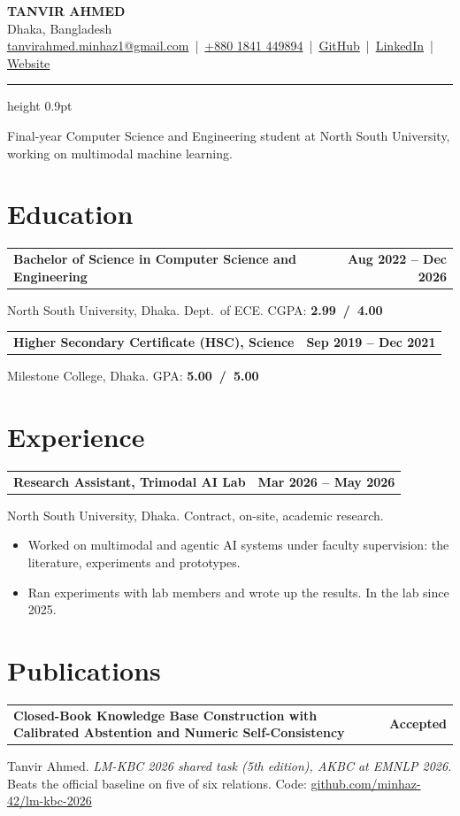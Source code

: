 \documentclass[10pt,letterpaper]{article}
\makeatletter
\newcommand{\entryhead}[2]{\par\vspace{4pt}\noindent%
  \begin{tabular*}{\textwidth}[t]{@{}>{\raggedright\arraybackslash}p{0.75\textwidth}@{\extracolsep{\fill}}r@{}}
    \textbf{#1} & #2
  \end{tabular*}\par\vspace{1pt}}
\newcommand{\entry}[2]{\entryhead{#1}{\textbf{#2}}}
\newcommand{\gap}{\par\vspace{4pt}}
\makeatother
\begin{document}
\begin{center}
  {\Huge\bfseries TANVIR AHMED}\\[7pt]
  Dhaka, Bangladesh\\[3pt]
  \href{mailto:tanvirahmed.minhaz1@gmail.com}{tanvirahmed.minhaz1@gmail.com} \,|\,
  \href{tel:+8801841449894}{+880 1841 449894} \,|\,
  \href{https://github.com/minhaz-42}{GitHub} \,|\,
  \href{https://www.linkedin.com/in/tanvir-ahmed-ml/}{LinkedIn} \,|\,
  \href{https://minhaz-42.github.io/Tanvir-Ahmed/}{Website}
\end{center}
\vspace{-4pt}
{\hrule height 0.9pt}

\vspace{6pt}
\noindent
Final-year Computer Science and Engineering student at North South University, working on
multimodal machine learning.

\section{Education}
\entry{Bachelor of Science in Computer Science and Engineering}{Aug 2022 -- Dec 2026}
North South University, Dhaka. Dept.\ of ECE. CGPA: \mbox{\textbf{2.99 / 4.00}}
\gap

\entry{Higher Secondary Certificate (HSC), Science}{Sep 2019 -- Dec 2021}
Milestone College, Dhaka. GPA: \mbox{\textbf{5.00 / 5.00}}

\section{Experience}
\entry{Research Assistant, Trimodal AI Lab}{Mar 2026 -- May 2026}
North South University, Dhaka. Contract, on-site, academic research.
\begin{itemize}
  \item Worked on multimodal and agentic AI systems under faculty supervision: the literature,
    experiments and prototypes.
  \item Ran experiments with lab members and wrote up the results. In the lab since 2025.
\end{itemize}

\section{Publications}
\entry{Closed-Book Knowledge Base Construction with Calibrated Abstention and Numeric Self-Consistency}{Accepted}
Tanvir Ahmed. \textit{LM-KBC 2026 shared task (5th edition), AKBC at EMNLP 2026.} Beats the
official baseline on five of six relations.
Code: \href{https://github.com/minhaz-42/lm-kbc-2026}{github.com/minhaz-42/lm-kbc-2026}
\end{document}
